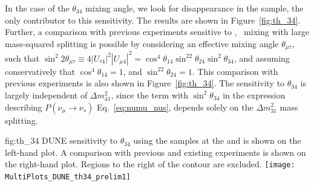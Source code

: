 
In the case of the $\theta_{34}$ mixing angle, we look for disappearance in the  sample, the only contributor to this sensitivity. The results are shown in Figure~\ref{fig:th_34}. Further, a comparison with previous experiments sensitive to \numu, \nutau~mixing with large mass-squared splitting is possible by considering an effective mixing angle $\theta_{\mu\tau}$, such that $\sin^2{2\theta_{\mu\tau}}\equiv 4|U_{\tau4}|^2|U_{\mu 4}|^2=\cos^4\theta_{14}\sin^22\theta_{24}\sin^2\theta_{34}$, and assuming conservatively that $\cos^4\theta_{14}=1$, and $\sin^22\theta_{24}=1$. This comparison with previous experiments is also shown in Figure~\ref{fig:th_34}.
The sensitivity to $\theta_{34}$ is largely independent of 
$\Delta m^2_{41}$, since the term with $\sin^2\theta_{34}$ in the expression describing $P(\nu_{\mu} \rightarrow \nu_s)$ Eq.~\ref{eq:numu_nus}, depends solely on the $\Delta m^2_{31}$ mass splitting.

\begin{dunefigure} {fig:th_34} 
{DUNE sensitivity to $\theta_{34}$ using the  samples at the  and  is shown on the left-hand plot. A comparison with previous and existing experiments is shown on the right-hand plot. Regions to the right of the contour are excluded.}
\texttt{[image: MultiPlots\_DUNE\_th34\_prelim1]}
\end{dunefigure}



